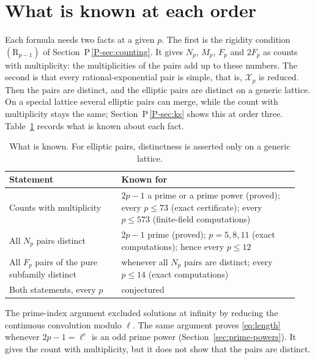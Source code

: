 \documentclass[11pt]{article}
\newcommand{\Xp}{\mathcal X_p}
\numberwithin{equation}{section}
\begin{document}
\section{What is known at each order}

Each formula needs two facts at a given \(p\). The first is the
rigidity condition \((\mathrm R_{p-1})\) of Section~P\,\ref{P-sec:counting}.
It gives \(N_p\), \(M_p\), \(F_p\) and \(2F_p\) as counts with
multiplicity: the multiplicities of the pairs add up to these numbers.
The second is that every rational-exponential pair is simple, that is,
\(\Xp\) is reduced. Then the pairs are distinct, and the elliptic pairs
are distinct on a generic lattice. On a special lattice several
elliptic pairs can merge, while the count with multiplicity stays the
same; Section~P\,\ref{P-sec:ks} shows this at order three.
Table~\ref{tab:status} records what is known about each fact.

\begin{table}[htbp]
\centering
\caption{What is known. For elliptic pairs, distinctness is asserted
only on a generic lattice.}
\label{tab:status}
\begin{tabular}{@{}p{0.36\linewidth}p{0.58\linewidth}@{}}
\toprule
Statement&Known for\\
\midrule
Counts with multiplicity&\(2p-1\) a prime or a prime power (proved);
every \(p\le73\) (exact certificate); every \(p\le573\) (finite-field
computations)\\[2pt]
All \(N_p\) pairs distinct&\(2p-1\) prime (proved); \(p=5,8,11\) (exact
computations); hence every \(p\le12\)\\[2pt]
All \(F_p\) pairs of the pure subfamily distinct&whenever all \(N_p\)
pairs are distinct; every \(p\le14\) (exact computations)\\[2pt]
Both statements, every \(p\)&conjectured\\
\bottomrule
\end{tabular}
\end{table}

The prime-index argument excluded solutions at infinity by reducing
the continuous convolution modulo \(\ell\). The same argument proves
\eqref{eq:length} whenever \(2p-1=\ell^e\) is an odd prime power
(Section~\ref{sec:prime-powers}). It gives the count with
multiplicity, but it does not show that the pairs are distinct.
\end{document}
